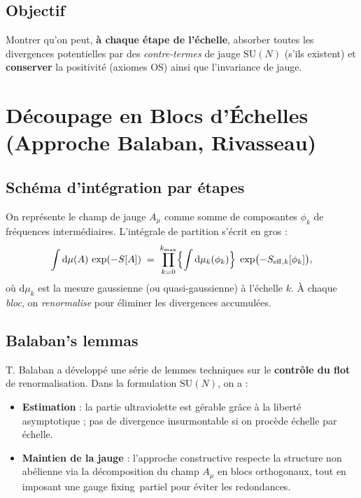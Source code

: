 \subsection*{Objectif}
Montrer qu’on peut, \textbf{à chaque étape de l’échelle}, absorber toutes les divergences potentielles par des \emph{contre-termes} de jauge \(\mathrm{SU}(N)\) (s’ils existent) et \textbf{conserver} la positivité (axiomes OS) ainsi que l’invariance de jauge.

\vspace{1em}

\section{Découpage en Blocs d’Échelles (Approche Balaban, Rivasseau)}
\label{sec:5.2}

\subsection*{Schéma d’intégration par étapes}
On représente le champ de jauge \(A_\mu\) comme somme de composantes \(\phi_k\) de fréquences intermédiaires. L’intégrale de partition s’écrit en gros :
\[
\int \mathrm{d}\mu(A)\,\exp(-S[A]) \;=\;
\prod_{k=0}^{k_{\max}} \Bigl\{\int \mathrm{d}\mu_k(\phi_k)\Bigr\}\;\exp\bigl(-S_{\mathrm{eff},k}[\phi_k]\bigr),
\]
où \(\mathrm{d}\mu_k\) est la mesure gaussienne (ou quasi-gaussienne) à l’échelle \(k\). À chaque \emph{bloc}, on \textit{renormalise} pour éliminer les divergences accumulées.

\subsection*{Balaban’s lemmas}
T. Balaban \cite{Balaban1982-1,Balaban1982-2} a développé une série de lemmes techniques sur le \textbf{contrôle du flot} de renormalisation. Dans la formulation \(\mathrm{SU}(N)\), on a :
\begin{itemize}
	\item \textbf{Estimation} : la partie ultraviolette est gérable grâce à la liberté asymptotique ; pas de divergence insurmontable si on procède échelle par échelle.
	\item \textbf{Maintien de la jauge} : l’approche constructive respecte la structure non abélienne via la décomposition du champ \(A_\mu\) en blocs orthogonaux, tout en imposant une \og gauge fixing\fg\ partiel pour éviter les redondances.
\end{itemize}

